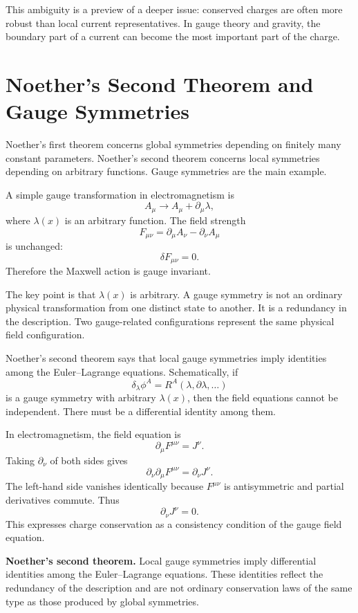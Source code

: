 This ambiguity is a preview of a deeper issue: conserved charges are often more
robust than local current representatives. In gauge theory and gravity, the
boundary part of a current can become the most important part of the charge.

\section{Noether's Second Theorem and Gauge Symmetries}

Noether's first theorem concerns global symmetries depending on finitely many
constant parameters. Noether's second theorem concerns local symmetries depending
on arbitrary functions. Gauge symmetries are the main example.

A simple gauge transformation in electromagnetism is
\[
    A_\mu\longrightarrow A_\mu+\partial_\mu\lambda,
\]
where \(\lambda(x)\) is an arbitrary function. The field strength
\[
    F_{\mu\nu}=\partial_\mu A_\nu-\partial_\nu A_\mu
\]
is unchanged:
\[
    \delta F_{\mu\nu}=0.
\]
Therefore the Maxwell action is gauge invariant.

The key point is that \(\lambda(x)\) is arbitrary. A gauge symmetry is not an
ordinary physical transformation from one distinct state to another. It is a
redundancy in the description. Two gauge-related configurations represent the
same physical field configuration.

Noether's second theorem says that local gauge symmetries imply identities among
the Euler--Lagrange equations. Schematically, if
\[
    \delta_\lambda\phi^A=R^A(\lambda,\partial\lambda,\ldots)
\]
is a gauge symmetry with arbitrary \(\lambda(x)\), then the field equations
cannot be independent. There must be a differential identity among them.

In electromagnetism, the field equation is
\[
    \partial_\mu F^{\mu\nu}=J^\nu.
\]
Taking \(\partial_\nu\) of both sides gives
\[
    \partial_\nu\partial_\mu F^{\mu\nu}=\partial_\nu J^\nu.
\]
The left-hand side vanishes identically because \(F^{\mu\nu}\) is antisymmetric
and partial derivatives commute. Thus
\[
    \partial_\nu J^\nu=0.
\]
This expresses charge conservation as a consistency condition of the gauge field
equation.

\begin{theorembox}
\textbf{Noether's second theorem.} Local gauge symmetries imply differential
identities among the Euler--Lagrange equations. These identities reflect the
redundancy of the description and are not ordinary conservation laws of the
same type as those produced by global symmetries.
\end{theorembox}

